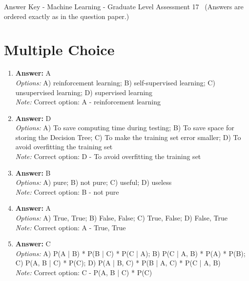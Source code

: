 \documentclass[12pt]{article}
\begin{document}
\begin{center}
Answer Key - Machine Learning - Graduate Level Assessment 17 \
\small (Answers are ordered exactly as in the question paper.)
\end{center}

\section*{Multiple Choice}
\begin{enumerate}[label=\arabic*.]
\item \textbf{Answer:} A
\\ \textit{Options:} A) reinforcement learning; B) self-supervised learning; C) unsupervised learning; D) supervised learning
\\ \textit{Note:} Correct option: A - reinforcement learning
\item \textbf{Answer:} D
\\ \textit{Options:} A) To save computing time during testing; B) To save space for storing the Decision Tree; C) To make the training set error smaller; D) To avoid overfitting the training set
\\ \textit{Note:} Correct option: D - To avoid overfitting the training set
\item \textbf{Answer:} B
\\ \textit{Options:} A) pure; B) not pure; C) useful; D) useless
\\ \textit{Note:} Correct option: B - not pure
\item \textbf{Answer:} A
\\ \textit{Options:} A) True, True; B) False, False; C) True, False; D) False, True
\\ \textit{Note:} Correct option: A - True, True
\item \textbf{Answer:} C
\\ \textit{Options:} A) P(A | B) * P(B | C) * P(C | A); B) P(C | A, B) * P(A) * P(B); C) P(A, B | C) * P(C); D) P(A | B, C) * P(B | A, C) * P(C | A, B)
\\ \textit{Note:} Correct option: C - P(A, B | C) * P(C)
\end{enumerate}
\end{document}
